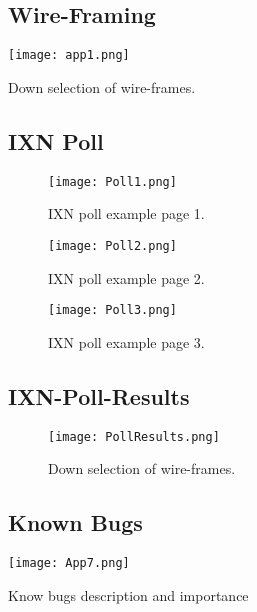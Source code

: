  \newpage

\begin{landscape}
\subsection{Wire-Framing}
\begin{table}[H]
      \centering
      \texttt{[image: app1.png]}
      \caption{Down selection of wire-frames.}
 \end{table}

\subsection{IXN Poll}
\begin{figure}[H]
      \centering
      \texttt{[image: Poll1.png]}
      \caption{IXN poll example page 1.}
 \end{figure}

 \begin{figure}[H]
      \centering
      \texttt{[image: Poll2.png]}
      \caption{IXN poll example page 2.}
 \end{figure}

 \begin{figure}[H]
      \centering
      \texttt{[image: Poll3.png]}
      \caption{IXN poll example page 3.}
 \end{figure}

\subsection{IXN-Poll-Results}
\begin{figure}[H]
      \centering
      \texttt{[image: PollResults.png]}
      \caption{Down selection of wire-frames.}
 \end{figure}
 \end{landscape}

 \newpage

\begin{landscape}
\subsection{Known Bugs}
 \begin{table}[H]
      \centering
      \texttt{[image: App7.png]}
      \caption{Know bugs description and importance}
 \end{table}
\end{landscape}


